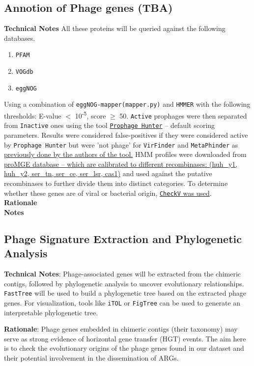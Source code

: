 \documentclass[11pt]{report}
\begin{document}
\subsection{Annotion of Phage genes (TBA)} 
\textbf{Technical Notes} All these proteins will be queried against the following databases.
\begin{enumerate}
	\item \texttt{{PFAM}}
	\item \texttt{VOGdb}
	\item \texttt{eggNOG} 
\end{enumerate}
Using a combination of \texttt{eggNOG-mapper(mapper.py)} and \texttt{HMMER} with the following thresholds: E-value $<$ 10\textsuperscript{-5}, score $\geq$ 50. \texttt{Active} prophages were then separated from \texttt{Inactive} ones using the tool \href{https://github.com/WenchenSONG/Prophage-Hunter}{\texttt{Prophage Hunter}} -- default scoring parameters. Results were considered false-positives if they were considered active by \texttt{Prophage Hunter} but were 'not phage' for \texttt{VirFinder} and \texttt{MetaPhinder} as \href{https://academic.oup.com/nar/article/47/W1/W74/5494712}{previously done by the authors of the tool.} HMM profiles were downloaded from \href{https://promge.embl.de/download.cgi}{proMGE database -- which are calibrated to different recombinases: (huh\_y1, huh\_y2, ser\_tn, ser\_ce, ser\_lsr, cas1)} and used against the putative recombinases to further divide them into distinct categories. To determine whether these genes are of viral or bacterial origin, \href{https://www.nature.com/articles/s41587-020-00774-7}{\texttt{CheckV} was used}.
\\ \textbf{Rationale}
\\ \textbf{Notes}


\subsection{Phage Signature Extraction and Phylogenetic Analysis}
\textbf{Technical Notes}: Phage-associated genes will be extracted from the chimeric contigs, followed by phylogenetic analysis to uncover evolutionary relationships. \texttt{FastTree} will be used to build a phylogenetic tree based on the extracted phage genes. For visualization, tools like \texttt{iTOL} or \texttt{FigTree} can be used to generate an interpretable phylogenetic tree.

\noindent \textbf{Rationale}: Phage genes embedded in chimeric contigs (their taxonomy) may serve as strong evidence of horizontal gene transfer (HGT) events. The aim here is to check the evolutionary origins of the phage genes found in our dataset and their potential involvement in the dissemination of ARGs.
\end{document}
